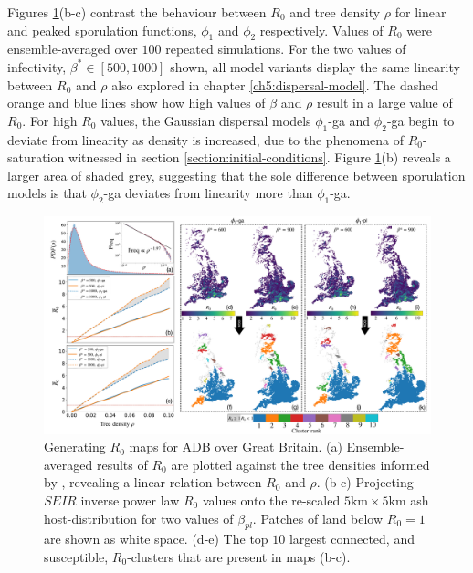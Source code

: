 Figures \ref{fig:R0-map-generation}(b-c) contrast the behaviour between $R_0$ and tree density $\rho$ for linear and peaked sporulation functions, $\phi_1$ and $\phi_2$ respectively.
Values of $R_0$ were ensemble-averaged over $100$ repeated simulations.
For the two values of infectivity, $\beta^*\in [500, 1000]$ shown, all model variants display the same linearity between $R_0$ and $\rho$ \textemdash also explored in chapter \ref{ch5:dispersal-model}.
The dashed orange and blue lines show how high values of $\beta$ and $\rho$ result in a large value of $R_0$.
For high $R_0$ values, the Gaussian dispersal models $\phi_1$-ga and $\phi_2$-ga begin to deviate from linearity as density is increased,
due to the phenomena of $R_0$-saturation witnessed in section \ref{section:initial-conditions}.
Figure \ref{fig:R0-map-generation}(b) reveals a larger area of shaded grey, 
suggesting that the sole difference between sporulation models is that $\phi_2$-ga deviates from linearity more than $\phi_1$-ga.

\begin{landscape}
\begin{figure}
    \centering
    \includegraphics[scale=0.38]{chapter6/figures/fig6-R0-map-generation.pdf}
    \caption{Generating $R_0$ maps for ADB over Great Britain. (a) Ensemble-averaged results of $R_0$ are plotted against the tree densities informed by \cite{hill.data}, revealing a linear relation between $R_0$ and $\rho$. (b-c) Projecting $SEIR$ inverse power law $R_0$ values onto the re-scaled $5\mathrm{km} \times 5 \mathrm{km}$ ash host-distribution for two values of $\beta_{pl}$. Patches of land below $R_0 = 1$ are shown as white space. (d-e) The top $10$ largest connected, and susceptible, $R_0$-clusters that are present in maps (b-c).}
    \label{fig:R0-map-generation}
\end{figure}
\end{landscape}

